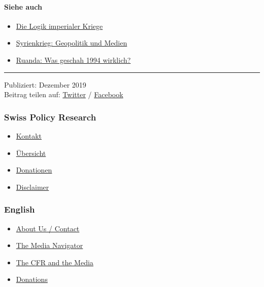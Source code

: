 \hypertarget{siehe-auch}{%
\paragraph{Siehe auch}\label{siehe-auch}}

\begin{itemize}
\tightlist
\item
  \href{https://swprs.org/logik-imperialer-kriege/}{Die Logik imperialer
  Kriege}
\item
  \href{https://swprs.org/syrienkrieg-geopolitik-medien/}{Syrienkrieg:
  Geopolitik und Medien}
\item
  \href{https://swprs.org/ruanda-was-geschah-wirklich/}{Ruanda: Was
  geschah 1994 wirklich?}
\end{itemize}

\begin{center}\rule{0.5\linewidth}{\linethickness}\end{center}

Publiziert: Dezember 2019\\
Beitrag teilen auf:
\href{https://twitter.com/intent/tweet?url=https://swprs.org/propaganda-im-jugoslawienkrieg/}{Twitter}
/
\href{https://www.facebook.com/share.php?u=https://swprs.org/propaganda-im-jugoslawienkrieg/}{Facebook}

\hypertarget{swiss-policy-research}{%
\subsubsection{Swiss Policy Research}\label{swiss-policy-research}}

\begin{itemize}
\tightlist
\item
  \href{https://swprs.org/kontakt/}{Kontakt}
\item
  \href{https://swprs.org/uebersicht/}{Übersicht}
\item
  \href{https://swprs.org/donationen/}{Donationen}
\item
  \href{https://swprs.org/disclaimer/}{Disclaimer}
\end{itemize}

\hypertarget{english}{%
\subsubsection{English}\label{english}}

\begin{itemize}
\tightlist
\item
  \href{https://swprs.org/contact/}{About Us / Contact}
\item
  \href{https://swprs.org/media-navigator/}{The Media Navigator}
\item
  \href{https://swprs.org/the-american-empire-and-its-media/}{The CFR
  and the Media}
\item
  \href{https://swprs.org/donations/}{Donations}
\end{itemize}

